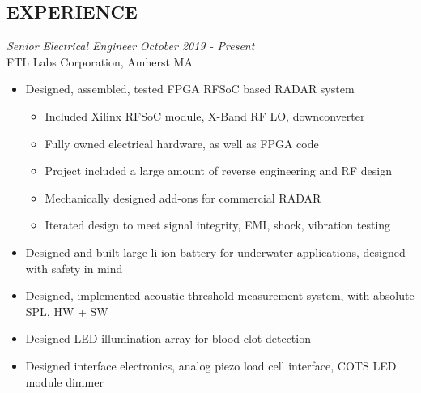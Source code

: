 \documentclass[line,mmmargin]{res}
\begin{document}
\begin{resume}
\section{EXPERIENCE} 
{\sl Senior Electrical Engineer} \hfill {\sl October 2019 - Present}\\
	FTL Labs Corporation, Amherst MA
	\begin{itemize}  \itemsep -2pt %
        \item Designed, assembled, tested FPGA RFSoC based RADAR system
	\vspace{-3pt}
	\begin{itemize}  \itemsep -4pt %
        \item Included Xilinx RFSoC module, X-Band RF LO, downconverter
        \item Fully owned electrical hardware, as well as FPGA code
        \item Project included a large amount of reverse engineering and RF design
        \item Mechanically designed add-ons for commercial RADAR
        \item Iterated design to meet signal integrity, EMI, shock, vibration testing
    \end{itemize}
	\vspace{-2pt}
		\item Designed and built large li-ion battery for
			underwater applications, designed with safety in mind
        \item Designed, implemented acoustic threshold measurement system, 
            with absolute SPL, HW + SW
        \item Designed LED illumination array for blood clot detection
		\item Designed interface electronics, analog piezo
			load cell interface, COTS LED module dimmer

\end{itemize}
\end{resume}
\end{document}
